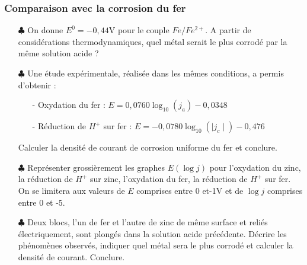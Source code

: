\documentclass{report}
\begin{document}
\subsubsection*{Comparaison avec la corrosion du fer}

\begin{itemize}
	
		\item[$\clubsuit$] On donne $E^0=-0,44$V pour le couple $Fe/Fe^{2+}$. A partir de considérations thermodynamiques, quel métal serait le plus corrodé par la même solution acide ?
		
	\item[$\clubsuit$] Une étude expérimentale, réalisée dans les mêmes conditions, a permis d'obtenir :
	\begin{itemize}
		\item[-] Oxydation du fer : $E=0,0760\log_{10}(j_a)-0,0348$
		\item[-] Réduction de $H^+$ sur fer : $E=-0,0780\log_{10}(\mid j_c\mid)-0,476$
	\end{itemize}
	Calculer la densité de courant de corrosion uniforme du fer et conclure.
		
	\item[$\clubsuit$] Représenter grossièrement les graphes $E(\log j)$ pour l'oxydation du zinc, la réduction de $H^+$ sur zinc, l'oxydation du fer, la réduction de $H^+$ sur fer. On se limitera aux valeurs de $E$ comprises entre 0 et-1V et de $\log j$ comprises entre 0 et -5.
	
	\item[$\clubsuit$] Deux blocs, l'un de fer et l'autre de zinc de même surface et reliés électriquement, sont plongés dans la solution acide précédente. Décrire les phénomènes observés, indiquer quel métal sera le plus corrodé et calculer la densité de courant. Conclure. 
	
\end{itemize}
\end{document}
